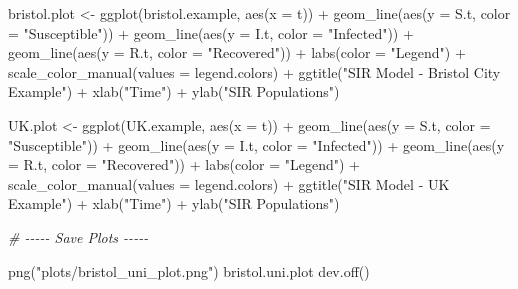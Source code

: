 \documentclass[
]{article}
\newenvironment{Shaded}{\begin{snugshade}}{\end{snugshade}}
\newcommand{\AttributeTok}[1]{\textcolor[rgb]{0.77,0.63,0.00}{#1}}
\newcommand{\CommentTok}[1]{\textcolor[rgb]{0.56,0.35,0.01}{\textit{#1}}}
\newcommand{\FunctionTok}[1]{\textcolor[rgb]{0.00,0.00,0.00}{#1}}
\newcommand{\NormalTok}[1]{#1}
\newcommand{\OtherTok}[1]{\textcolor[rgb]{0.56,0.35,0.01}{#1}}
\newcommand{\SpecialCharTok}[1]{\textcolor[rgb]{0.00,0.00,0.00}{#1}}
\newcommand{\StringTok}[1]{\textcolor[rgb]{0.31,0.60,0.02}{#1}}
\begin{document}
\begin{Shaded}
\begin{Highlighting}[]
\NormalTok{bristol.plot }\OtherTok{\textless{}{-}} \FunctionTok{ggplot}\NormalTok{(bristol.example, }\FunctionTok{aes}\NormalTok{(}\AttributeTok{x =}\NormalTok{ t)) }\SpecialCharTok{+}
  \FunctionTok{geom\_line}\NormalTok{(}\FunctionTok{aes}\NormalTok{(}\AttributeTok{y  =}\NormalTok{ S.t, }\AttributeTok{color =} \StringTok{"Susceptible"}\NormalTok{)) }\SpecialCharTok{+}
  \FunctionTok{geom\_line}\NormalTok{(}\FunctionTok{aes}\NormalTok{(}\AttributeTok{y  =}\NormalTok{ I.t, }\AttributeTok{color =} \StringTok{"Infected"}\NormalTok{)) }\SpecialCharTok{+}
  \FunctionTok{geom\_line}\NormalTok{(}\FunctionTok{aes}\NormalTok{(}\AttributeTok{y  =}\NormalTok{ R.t, }\AttributeTok{color =} \StringTok{"Recovered"}\NormalTok{)) }\SpecialCharTok{+}
  \FunctionTok{labs}\NormalTok{(}\AttributeTok{color =} \StringTok{"Legend"}\NormalTok{) }\SpecialCharTok{+}
  \FunctionTok{scale\_color\_manual}\NormalTok{(}\AttributeTok{values =}\NormalTok{ legend.colors) }\SpecialCharTok{+}
  \FunctionTok{ggtitle}\NormalTok{(}\StringTok{"SIR Model {-} Bristol City Example"}\NormalTok{) }\SpecialCharTok{+}
  \FunctionTok{xlab}\NormalTok{(}\StringTok{"Time"}\NormalTok{) }\SpecialCharTok{+}
  \FunctionTok{ylab}\NormalTok{(}\StringTok{"SIR Populations"}\NormalTok{)}

\NormalTok{UK.plot }\OtherTok{\textless{}{-}} \FunctionTok{ggplot}\NormalTok{(UK.example, }\FunctionTok{aes}\NormalTok{(}\AttributeTok{x =}\NormalTok{ t)) }\SpecialCharTok{+}
  \FunctionTok{geom\_line}\NormalTok{(}\FunctionTok{aes}\NormalTok{(}\AttributeTok{y  =}\NormalTok{ S.t, }\AttributeTok{color =} \StringTok{"Susceptible"}\NormalTok{)) }\SpecialCharTok{+}
  \FunctionTok{geom\_line}\NormalTok{(}\FunctionTok{aes}\NormalTok{(}\AttributeTok{y  =}\NormalTok{ I.t, }\AttributeTok{color =} \StringTok{"Infected"}\NormalTok{)) }\SpecialCharTok{+}
  \FunctionTok{geom\_line}\NormalTok{(}\FunctionTok{aes}\NormalTok{(}\AttributeTok{y  =}\NormalTok{ R.t, }\AttributeTok{color =} \StringTok{"Recovered"}\NormalTok{)) }\SpecialCharTok{+}
  \FunctionTok{labs}\NormalTok{(}\AttributeTok{color =} \StringTok{"Legend"}\NormalTok{) }\SpecialCharTok{+}
  \FunctionTok{scale\_color\_manual}\NormalTok{(}\AttributeTok{values =}\NormalTok{ legend.colors) }\SpecialCharTok{+}
  \FunctionTok{ggtitle}\NormalTok{(}\StringTok{"SIR Model {-} UK Example"}\NormalTok{) }\SpecialCharTok{+}
  \FunctionTok{xlab}\NormalTok{(}\StringTok{"Time"}\NormalTok{) }\SpecialCharTok{+}
  \FunctionTok{ylab}\NormalTok{(}\StringTok{"SIR Populations"}\NormalTok{)}



\CommentTok{\# {-}{-}{-}{-}{-} Save Plots {-}{-}{-}{-}{-}}

\FunctionTok{png}\NormalTok{(}\StringTok{"plots/bristol\_uni\_plot.png"}\NormalTok{)}
\NormalTok{bristol.uni.plot}
\FunctionTok{dev.off}\NormalTok{()}
\end{Highlighting}
\end{Shaded}
\end{document}
